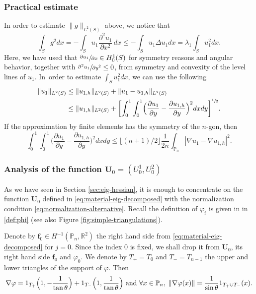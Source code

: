 \documentclass[JEP,XML,SOM,Unicode,ThmDefs,NoFloatCountersInSection,published]{cedram}
\theoremstyle{plain}
\theoremstyle{definition}
\newcommand{\bo}[1]{{\boldsymbol#1}}
\let\Bbb\mathbb
\def\Pp{{\mathbb{P}_n}}
\newcommand{\vphi}{\varphi}
\newcommand{\lb}{\lambda}
\begin{document}
\subsubsection*{Practical estimate} In order to estimate $ \|g\|_{L^2(S)}$ above, we notice that
\[
\int_S g^2dx = - \int_S u_1 \frac {\partial^2 u_1} {\partial x^2}\, dx\le - \int_S u_1 \Delta u_1dx= \lb_1 \int_S u_1^2dx.
\]
Here, we have used that $ \sfrac{\partial u_1}{\partial x}\in H^1_0(S)$ for symmetry reasons and angular behavior, together with $\sfrac {\partial^2 u_1} {\partial y^2} \le 0$, from symmetry and convexity of the level lines of $u_1$. In~order to estimate $ \int_S u_1^2dx$, we can use the following
\begin{align*}
\|u_1\|_{L^2(S)} &\le \|u_{1,h}\|_{L^2(S)}+\|u_1-u_{1,h}\|_{L^2(S)} \\
&\le \|u_{1,h}\|_{L^2(S)}+ \biggl[\int_{0}^{1} \int_0^{1} \Bigl(\frac{\partial u_1}{\partial y}-\frac{\partial u_{1,h}}{\partial y}\Bigr)^2 dx dy\biggr]^{\sfrac 12}.
\end{align*}
If the approximation by finite elements has the symmetry of the $n$-gon, then
\[
\int_{0}^{1} \int_0^{1} \Big (\frac{\partial u_1}{\partial y}-\frac{\partial u_{1,h}}{\partial y}\Big)^2 dx dy\le \lfloor (n+1)/2\rfloor \frac{1}{2n}\int_{\Pp} |\nabla u_1-\nabla u_{1,h} |^2.
\]

\subsubsection*{Analysis of the function $\bo U_0= (U_0^1, U_0^2)$} As we have seen in Section \ref{sec:eig-hessian}, it is enough to concentrate on the function $\bo U_0$ defined in \eqref{eq:material-eig-decomposed} with the normalization condition \eqref{eq:normalization-alternative}. Recall the definition of $\varphi_i$ is given in in \eqref{def:phi} (see also Figure \ref{fig:simple-triangulations}).

Denote by $\bo f_0\in H^{-1}(\Pp,\Bbb{R}^2)$ the right hand side from \eqref{eq:material-eig-decomposed} for $j=0$. Since the index $0$ is fixed, we shall drop it from $\bo U_0$, its right hand side $\bo f_0$ and $\vphi_0$. We denote by $T_+=T_0$ and $ T_-=T_{n-1}$ the upper and lower triangles of the support of $\vphi$. Then
\[
\nabla \vphi= 1_{T_+} \Bigl (1,-\frac{1}{\tan \theta }\Bigr) + 1_{T_-} \Bigl (1,\frac{1}{\tan \theta}\Bigr) \mbox{ and } \forall x \in \Pp, \; \|\nabla \varphi (x) \|= \frac{1}{\sin \theta} 1_{T_+\cup T_-}(x).
\]
\end{document}
